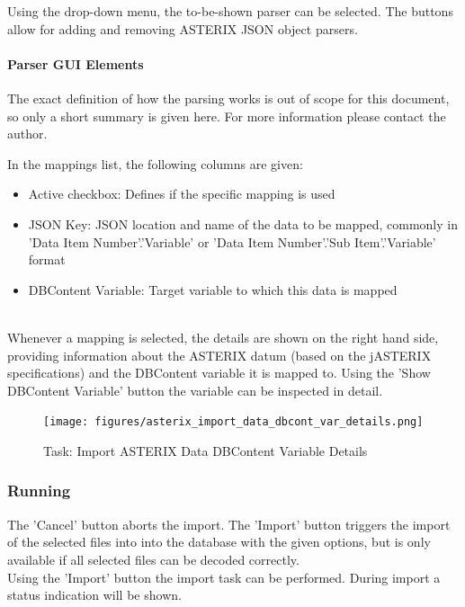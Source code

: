 Using the drop-down menu, the to-be-shown parser can be selected. The buttons allow for adding and removing ASTERIX JSON object parsers.

\paragraph{Parser GUI Elements}

The exact definition of how the parsing works is out of scope for this document, so only a short summary is given here. For more information please contact the author.

In the mappings list, the following columns are given:

\begin{itemize}
\item Active checkbox: Defines if the specific mapping is used
\item JSON Key: JSON location and name of the data to be mapped, commonly in 'Data Item Number'.'Variable' or 'Data Item Number'.'Sub Item'.'Variable' format
\item DBContent Variable: Target variable to which this data is mapped
\end{itemize}
\ \\

Whenever a mapping is selected, the details are shown on the right hand side, providing information about the ASTERIX datum (based on the jASTERIX specifications) and the DBContent variable it is mapped to. 
Using the 'Show DBContent Variable' button the variable can be inspected in detail.

\begin{figure}[H]
  \center
    \texttt{[image: figures/asterix\_import\_data\_dbcont\_var\_details.png]}
  \caption{Task: Import ASTERIX Data DBContent Variable Details}
\end{figure}

\subsubsection{Running}

The 'Cancel' button aborts the import.  The 'Import' button triggers the import of the selected files into into the database with the given options, but is only available if all selected files can be decoded correctly. \\

Using the 'Import' button the import task can be performed. During import a status indication will be shown. \\

